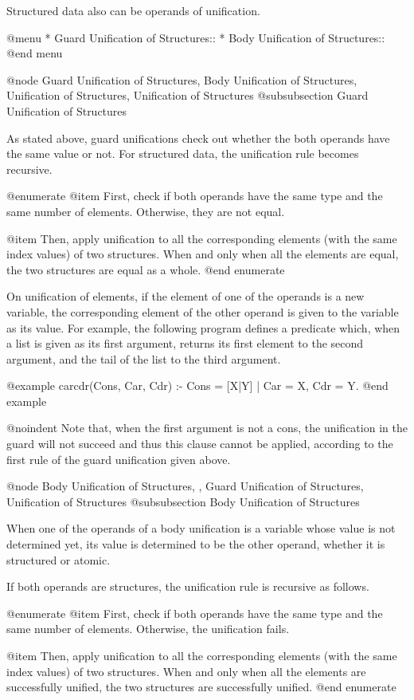 {Structured data also can be operands of unification.

@menu
* Guard Unification of Structures::  
* Body Unification of Structures::  
@end menu

@node Guard Unification of Structures, Body Unification of Structures, Unification of Structures, Unification of Structures
@subsubsection Guard Unification of Structures

As stated above, guard unifications check out whether the both
operands have the same value or not.  For structured data, the
unification rule becomes recursive.

@enumerate
@item
First, check if both operands have the same type and the same number
of elements.  Otherwise, they are not equal.

@item
Then, apply unification to all the corresponding elements (with the
same index values) of two structures.  When and only when all the
elements are equal, the two structures are equal as a whole.
@end enumerate

On unification of elements, if the element of one of the operands is a
new variable, the corresponding element of the other operand is given to
the variable as its value.  For example, the following program defines a
predicate which, when a list is given as its first argument, returns its
first element to the second argument, and the tail of the list to the
third argument.

@example
carcdr(Cons, Car, Cdr) :- Cons = [X|Y] | Car = X, Cdr = Y.
@end example

@noindent
Note that, when the first argument is not a cons, the unification in the
guard will not succeed and thus this clause cannot be applied, according
to the first rule of the guard unification given above.

@node Body Unification of Structures,  , Guard Unification of Structures, Unification of Structures
@subsubsection Body Unification of Structures

When one of the operands of a body unification is a variable whose value
is not determined yet, its value is determined to be the other operand,
whether it is structured or atomic.

If both operands are structures, the unification rule is recursive as
follows.

@enumerate
@item
First, check if both operands have the same type and the same number
of elements.  Otherwise, the unification fails.

@item
Then, apply unification to all the corresponding elements (with the
same index values) of two structures.  When and only when all the
elements are successfully unified, the two structures are
successfully unified.
@end enumerate

}
